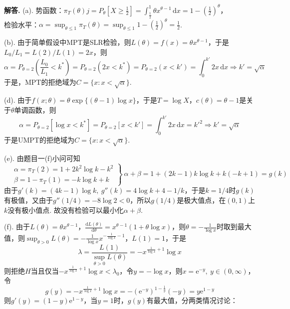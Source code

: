 \documentclass[12pt, a4paper, oneside]{ctexart}
\newenvironment{solution}[1][]{\par\noindent\textbf{#1解答. }}{\smallskip\par}  %
\let\leq=\leqslant %
\let\geq=\geqslant %
\def\d{\mathrm{d}}          %
\def\e{\mathrm{e}}          %
\def\add{\vspace{1ex}}      %
\begin{document}
\begin{solution}
    (a). 势函数：$\pi_{T}(\theta)j = P_{\theta}\left[X\geq \frac{1}{2}\right] = \int_{\frac{1}{2}}^1\theta x^{\theta-1}\,\d x=1-\left(\frac{1}{2}\right)^\theta$，\add \\
    检验水平：$\alpha = \sup_{\theta\leq 1}\pi_T(\theta) = \sup_{\theta\leq 1}1-\left(\frac{1}{2}\right)^\theta = \frac{1}{2}$.\add 

    (b). 由于简单假设中MPT是SLR检验，则$L(\theta) = f(x) = \theta x^{\theta-1}$，于是$L_0/L_1 = L(2) / L(1) = 2x$，则
    \begin{equation*}
        \alpha = P_{\theta=2}\left(\frac{L_0}{L_1}<k^*\right)= P_{\theta=2}(2x<k^*) = P_{\theta=2}(x < k') = \int_0^{k'}2x\,\d x\Rightarrow k'=\sqrt{\alpha}
    \end{equation*}
    于是，MPT的拒绝域为$C=\{x:x<\sqrt{\alpha}\}$.\add

    (d). 由于$f(x;\theta) = \theta\exp\{(\theta-1)\log x\}$，于是$T = \log X$，$c(\theta) = \theta-1$是关于$\theta$单调函数，则
    \begin{equation*}
        \alpha  = P_{\theta=2}[\log x < k^*] = P_{\theta=2}[x<k'] = \int_0^{k'}2x\,\d x = k'^2\Rightarrow k' = \sqrt{\alpha}
    \end{equation*}
    于是UMPT的拒绝域为$C = \{x:x < \sqrt{\alpha}\}$.

    (e). 由题目一(f)小问可知
    \begin{equation*}
        \left.\begin{aligned}
            &\ \alpha = \pi_T(2) = 1 + 2k^2\log k - k^2\\
            &\ \beta = 1 - \pi_T(1) = -k\log k + k
        \end{aligned}\right\}\ \alpha+\beta = 1+(2k-1)k\log k + k(-k+1) = g(k)
    \end{equation*}
    由于$g'(k) = (4k-1)\log k,\ g''(k) = 4\log k + 4 - 1/k$，于是$k=1/4$时$g(k)$有极值，又由于$g''(1/4) = -8\log 2 < 0$，所以$g(1/4)$是极大值点，在$(0,1)$上$k$没有极小值点. 故没有检验可以最小化$\alpha+\beta$.

    (f). 由于$L(\theta) = \theta x^{\theta -1}$，$\frac{\d L(\theta)}{\d \theta} = x^{\theta-1}(1+\theta \log x)$，则$\theta = -\frac{1}{\log x}$时取到最大值，则$\sup_{\theta > 0}L(\theta) = -\frac{1}{\log x}x^{-\frac{1}{\log x}-1}$，$L(1) = 1$，于是
    \begin{equation*}
        \lambda = \frac{L(1)}{\sup_{\theta > 0}L(\theta)} = -x^{\frac{1}{\log x}+1}\log x
    \end{equation*}
    则拒绝$H$当且仅当$-x^{\frac{1}{\log x}+1}\log x < \lambda_0$，令$y=-\log x$，则$x=\e^{-y},\ y\in(0,\infty)$，令
    \begin{equation*}
        g(y) = -x^{\frac{1}{\log x}+1}\log x = -\left(\e^{-y}\right)^{1-\frac{1}{y}}(-y) = y\e^{1-y}
    \end{equation*}
    则$g'(y) = (1-y)\e^{1-y}$，当$y=1$时，$g(y)$有最大值，分两类情况讨论：


\end{solution}
\end{document}

